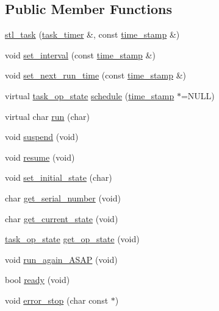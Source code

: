 \subsection*{Public Member Functions}
\begin{DoxyCompactItemize}
\item 
\hyperlink{classstl__task_af8f81fb3e56c9d72b3b273ea1fe28d39}{stl\-\_\-task} (\hyperlink{classtask__timer}{task\-\_\-timer} \&, const \hyperlink{classtime__stamp}{time\-\_\-stamp} \&)
\item 
void \hyperlink{classstl__task_a809314255837a6ba122bef5a03775b9a}{set\-\_\-interval} (const \hyperlink{classtime__stamp}{time\-\_\-stamp} \&)
\item 
void \hyperlink{classstl__task_a5d06fa647b9492360a9c38fe429f7ccc}{set\-\_\-next\-\_\-run\-\_\-time} (const \hyperlink{classtime__stamp}{time\-\_\-stamp} \&)
\item 
virtual \hyperlink{stl__task_8h_ab7f098b819a25c755325d69a07030021}{task\-\_\-op\-\_\-state} \hyperlink{classstl__task_a86a54618c911663e235f07fba78c728a}{schedule} (\hyperlink{classtime__stamp}{time\-\_\-stamp} $\ast$=N\-U\-L\-L)
\item 
virtual char \hyperlink{classstl__task_a35f8eccc4a9c6737d217402b3cb0ffee}{run} (char)
\item 
void \hyperlink{classstl__task_a8e49886b5ecd7479a3d09d378b09d97f}{suspend} (void)
\item 
void \hyperlink{classstl__task_acdec061dcd4755e8a870383433b1fc5b}{resume} (void)
\item 
void \hyperlink{classstl__task_a73904c3a785fbb3eb0f0041bca5926fe}{set\-\_\-initial\-\_\-state} (char)
\item 
char \hyperlink{classstl__task_add7d50aa3d9137e11bad5aef502aac2d}{get\-\_\-serial\-\_\-number} (void)
\item 
char \hyperlink{classstl__task_aacad5f6dd55902d3292c75f6baed8648}{get\-\_\-current\-\_\-state} (void)
\item 
\hyperlink{stl__task_8h_ab7f098b819a25c755325d69a07030021}{task\-\_\-op\-\_\-state} \hyperlink{classstl__task_abdc3f4e187b2b87aa3ce8c9fb851a27a}{get\-\_\-op\-\_\-state} (void)
\item 
void \hyperlink{classstl__task_aa976345c69db9b31f42442a04adda32e}{run\-\_\-again\-\_\-\-A\-S\-A\-P} (void)
\item 
bool \hyperlink{classstl__task_a8518939173f61a31158c29404b649a54}{ready} (void)
\item 
void \hyperlink{classstl__task_ab114eb46ce3bf58263d42a3528288d5d}{error\-\_\-stop} (char const $\ast$)
\end{DoxyCompactItemize}
